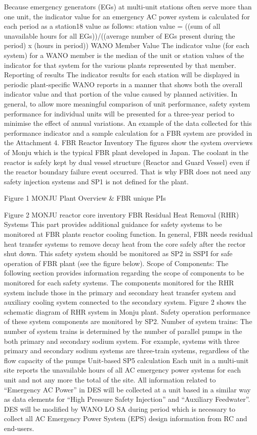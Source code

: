 Because emergency generators (EGs) at multi-unit stations often serve more than one unit, the indicator value for an emergency AC power system is calculated for each period as a station18 value as follows:
station value =  ((sum of all unavailable hours for all EGs))/((average number of EGs present during the period) x (hours in period))
WANO Member Value
The indicator value (for each system) for a WANO member is the median of the unit or station values of the indicator for that system for the various plants represented by that member.
Reporting of results
The indicator results for each station will be displayed in periodic plant-specific WANO reports in a manner that shows both the overall indicator value and that portion of the value caused by planned activities.
In general, to allow more meaningful comparison of unit performance, safety system performance for individual units will be presented for a three-year period to minimise the effect of annual variations.
An example of the data collected for this performance indicator and a sample calculation for a FBR system are provided in the Attachment 4.
FBR Reactor Inventory
The figures show the system overviews of Monju which is the typical FBR plant developed in Japan. The coolant in the reactor is safely kept by dual vessel structure (Reactor and Guard Vessel) even if the reactor boundary failure event occurred. That is why FBR does not need any safety injection systems and SP1 is not defined for the plant.

Figure 1 MONJU Plant Overview \& FBR unique PIs


Figure 2 MONJU reactor core inventory
FBR Residual Heat Removal (RHR) Systems
This part provides additional guidance for safety systems to be monitored at FBR plants reactor cooling function. In general, FBR needs residual heat transfer systems to remove decay heat from the core safely after the rector shut down. This safety system should be monitored as SP2 in SSPI for safe operation of FBR plant (see the figure below).
Scope of Components: The following section provides information regarding the scope of components to be monitored for each safety systems.
The components monitored for the RHR system include those in the primary and secondary heat transfer system and auxiliary cooling system connected to the secondary system. Figure 2 shows the schematic diagram of RHR system in Monju plant. Safety operation performance of these system components are monitored by SP2.
Number of system trains: The number of system trains is determined by the number of parallel pumps in the both primary and secondary sodium system. For example, systems with three primary and secondary sodium systems are three-train systems, regardless of the flow capacity of the pumps
 Unit-based SP5 calculation
Each unit in a multi-unit site reports the unavailable hours of all AC emergency power systems for each unit and not any more the total of the site.
All information related to “Emergency AC Power” in DES will be collected at a unit based in a similar way as data elements for “High Pressure Safety Injection” and “Auxiliary Feedwater”.
DES will be modified by WANO LO SA during period which is necessary to collect all AC Emergency Power System (EPS) design information from RC and end-users.

